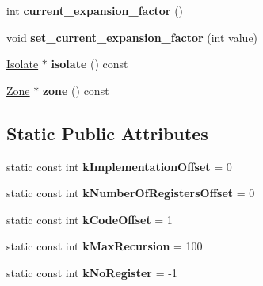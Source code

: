 \begin{DoxyCompactItemize}
\item 
int {\bfseries current\+\_\+expansion\+\_\+factor} ()\hypertarget{classv8_1_1internal_1_1_reg_exp_compiler_adc1f83db58276212db7873e5dc270094}{}\label{classv8_1_1internal_1_1_reg_exp_compiler_adc1f83db58276212db7873e5dc270094}

\item 
void {\bfseries set\+\_\+current\+\_\+expansion\+\_\+factor} (int value)\hypertarget{classv8_1_1internal_1_1_reg_exp_compiler_a7dfe84e5b220d01d26a496de3774dedf}{}\label{classv8_1_1internal_1_1_reg_exp_compiler_a7dfe84e5b220d01d26a496de3774dedf}

\item 
\hyperlink{classv8_1_1internal_1_1_isolate}{Isolate} $\ast$ {\bfseries isolate} () const \hypertarget{classv8_1_1internal_1_1_reg_exp_compiler_a6cb2d09316ab8a041c8cc1fd429a0899}{}\label{classv8_1_1internal_1_1_reg_exp_compiler_a6cb2d09316ab8a041c8cc1fd429a0899}

\item 
\hyperlink{classv8_1_1internal_1_1_zone}{Zone} $\ast$ {\bfseries zone} () const \hypertarget{classv8_1_1internal_1_1_reg_exp_compiler_a8758b3a29e43faa02250fa9c9f1f437c}{}\label{classv8_1_1internal_1_1_reg_exp_compiler_a8758b3a29e43faa02250fa9c9f1f437c}

\end{DoxyCompactItemize}
\subsection*{Static Public Attributes}
\begin{DoxyCompactItemize}
\item 
static const int {\bfseries k\+Implementation\+Offset} = 0\hypertarget{classv8_1_1internal_1_1_reg_exp_compiler_a25cdd87f20befcbf492dba4d8879d7db}{}\label{classv8_1_1internal_1_1_reg_exp_compiler_a25cdd87f20befcbf492dba4d8879d7db}

\item 
static const int {\bfseries k\+Number\+Of\+Registers\+Offset} = 0\hypertarget{classv8_1_1internal_1_1_reg_exp_compiler_a3f79771d4cc180edef0a3873e9b08b5e}{}\label{classv8_1_1internal_1_1_reg_exp_compiler_a3f79771d4cc180edef0a3873e9b08b5e}

\item 
static const int {\bfseries k\+Code\+Offset} = 1\hypertarget{classv8_1_1internal_1_1_reg_exp_compiler_aba94df58a0e68431d9ba15eee19a9546}{}\label{classv8_1_1internal_1_1_reg_exp_compiler_aba94df58a0e68431d9ba15eee19a9546}

\item 
static const int {\bfseries k\+Max\+Recursion} = 100\hypertarget{classv8_1_1internal_1_1_reg_exp_compiler_a20ca0907396d11d68732f878a36b5cc3}{}\label{classv8_1_1internal_1_1_reg_exp_compiler_a20ca0907396d11d68732f878a36b5cc3}

\item 
static const int {\bfseries k\+No\+Register} = -\/1\hypertarget{classv8_1_1internal_1_1_reg_exp_compiler_a70d86cf98e453fe3aad673ccd021092e}{}\label{classv8_1_1internal_1_1_reg_exp_compiler_a70d86cf98e453fe3aad673ccd021092e}

\end{DoxyCompactItemize}
